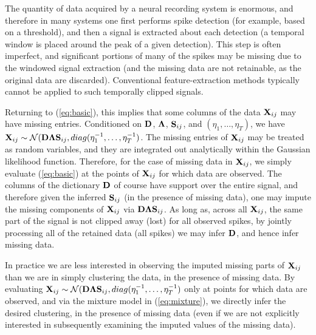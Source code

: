\documentclass[journal]{IEEEtran}
\begin{document}
The quantity of data acquired by a neural recording system is enormous, and therefore in many systems one first performs spike detection (for example, based on a threshold), and then a signal is extracted about each detection (a temporal window is placed around the peak of a given detection). This step is often imperfect, and significant portions of many of the spikes may be missing due to the windowed signal extraction (and the missing data are not retainable, as the original data are discarded). Conventional feature-extraction methods typically cannot be applied to such temporally clipped signals.

Returning to (\ref{eq:basic}), this implies that some columns of the data ${\mathbf X}_{ij}$ may have missing entries. Conditioned on ${\mathbf D}$, $\boldsymbol{\Lambda}$, ${\mathbf S}_{ij}$, and $(\eta_1,\dots,\eta_T)$, we have ${\mathbf X}_{ij}\sim\mathcal{N}({\mathbf D}\boldsymbol{\Lambda}{\mathbf S}_{ij},\relax{diag}(\eta_1^{-1},\dots,\eta_T^{-1})$. The missing entries of ${\mathbf X}_{ij}$ may be treated as random variables, and they are integrated out analytically within the Gaussian likelihood function. Therefore, for the case of missing data in ${\mathbf X}_{ij}$, we simply evaluate (\ref{eq:basic}) at the points of ${\mathbf X}_{ij}$ for which data are observed. The columns of the dictionary ${\mathbf D}$ of course have support over the entire signal, and therefore given the inferred ${\mathbf S}_{ij}$ (in the presence of missing data), one may impute the missing components of ${\mathbf X}_{ij}$ via ${\mathbf D}\boldsymbol{\Lambda}{\mathbf S}_{ij}$. As long as, across all ${\mathbf X}_{ij}$, the same part of the signal is not clipped away (lost) for all observed spikes, by jointly processing all of the {retained} data (all spikes) we may infer ${\mathbf D}$, and hence infer missing data.

In practice we are less interested in observing the imputed missing parts of ${\mathbf X}_{ij}$ than we are in simply clustering the data, in the presence of missing data. By evaluating ${\mathbf X}_{ij}\sim\mathcal{N}({\mathbf D}\boldsymbol{\Lambda}{\mathbf S}_{ij},\relax{diag}(\eta_1^{-1},\dots,\eta_T^{-1})$ only at points for which data are observed, and via the mixture model in (\ref{eq:mixture}), we directly infer the desired clustering, in the presence of missing data (even if we are not explicitly interested in subsequently examining the imputed values of the missing data).
\end{document}
